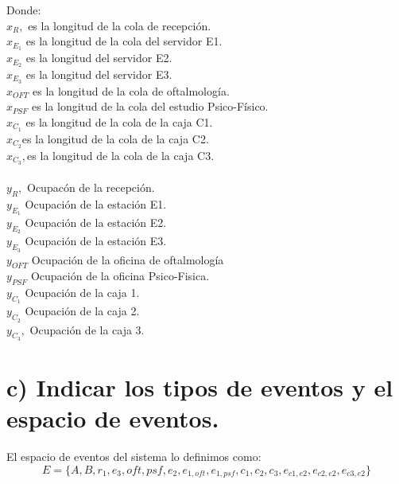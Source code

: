 \documentclass{article}
\numberwithin{equation}{section}
\numberwithin{figure}{section}
\numberwithin{table}{section}
\begin{document}
Donde: \\
 $x_R,$ es la longitud de la cola de recepci\'on.\\
$x_{E_1}$ es la longitud de la cola del servidor E1.\\
$x_{E_2}$ es la longitud del servidor E2.\\
$x_{E_3}$ es la longitud del servidor E3.\\
$ x_{OFT}$ es la longitud de la cola de oftalmolog\'ia.\\
$x_ {PSF}$ es la longitud de la cola del estudio Psico-F\'isico.\\
$x_{C_1}$ es la longitud de la cola de la caja C1.\\
$x_{C_2}$es la longitud de la cola de la caja C2.\\
$x_{C_3},$es la longitud de la cola de la caja C3.\\ \\
\noindent
$y_R,$ Ocupac\'on de la recepci\'on.\\
$y_{E_1}$ Ocupaci\'on de la estaci\'on E1.\\
$y_{E_2}$ Ocupaci\'on de la  estaci\'on E2.\\
$y_{E_3}$ Ocupaci\'on de la  estaci\'on E3.\\
$ y_{OFT}$ Ocupaci\'on de la oficina de oftalmolog\'ia\\
$y_ {PSF}$ Ocupaci\'on de la oficina Psico-Fisica.\\
$y_{C_1}$ Ocupaci\'on de la caja 1.\\
$y_{C_2}$ Ocupaci\'on de la caja 2.\\
$y_{C_3},$ Ocupaci\'on de la caja 3.\\

\section*{c) Indicar los tipos de eventos y el espacio de eventos.}
El espacio de eventos del sistema lo definimos como:\\
\begin{equation*}
E = \{ A, B, r_1, e_3, oft, psf, e_2, e_{1, oft}, e_{1, psf}, c_1, c_2, c_3, e_{c1,e2}, e_{c2,e2}, e_{c3, e2} \}
\end{equation*}
\end{document}
